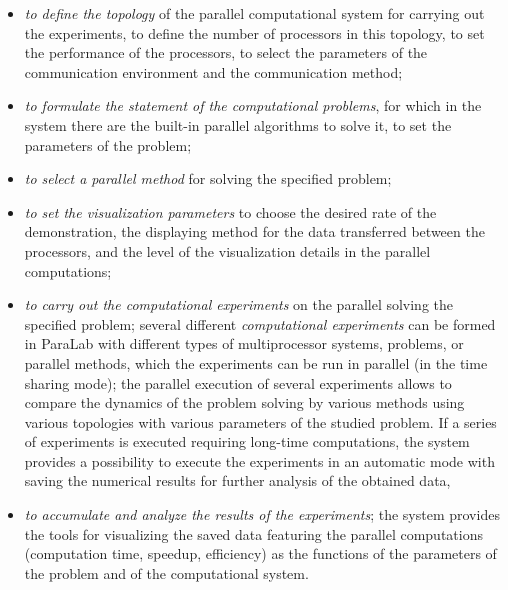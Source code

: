 \begin{itemize}
\item \textit{to define the topology} of the parallel computational system for carrying out the experiments, to define the number of processors in this topology, to set the performance of the processors, to select the parameters of the communication environment and the communication method;

\item \textit{to formulate the statement of the computational problems}, for which in the system there are the built-in parallel algorithms to solve it, to set the parameters of the problem;

\item \textit{to select a parallel method} for solving the specified problem;

\item \textit{to set the visualization parameters} to choose the desired rate of the demonstration, the displaying method for the data transferred between the processors, and the level of the visualization details in the parallel computations;

\item \textit{to carry out the computational experiments} on the parallel solving the specified problem; several different \textit{computational experiments} can be formed in ParaLab with different types of multiprocessor systems, problems, or parallel methods, which the experiments can be run in parallel (in the time sharing mode); the parallel execution of several experiments allows to compare the dynamics of the problem solving by various methods using various topologies with various parameters of the studied problem. If a series of experiments is executed requiring long-time computations, the system provides a possibility to execute the experiments in an automatic mode with saving the numerical results for further analysis of the obtained data,

\item \textit{to accumulate and analyze the results of the experiments}; the system provides the tools for visualizing the saved data featuring the parallel computations (computation time, speedup, efficiency) as the functions of the parameters of the problem and of the computational system.
\end{itemize}

